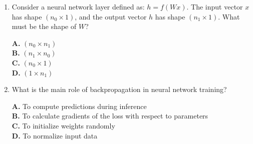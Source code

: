 \documentclass[11pt]{article}
\begin{document}
\begin{enumerate}[label=Q\arabic*., leftmargin=*]
\item Consider a neural network layer defined as: $h = f(Wx)$. The input vector $x$ has shape $(n_0 \times 1)$, and the output vector $h$ has shape $(n_1 \times 1)$. What must be the shape of $W$?

\textbf{A.} $(n_0 \times n_1)$\\
\textbf{B.} $(n_1 \times n_0)$\\
\textbf{C.} $(n_0 \times 1)$\\
\textbf{D.} $(1 \times n_1)$

\item What is the main role of backpropagation in neural network training?

\textbf{A.} To compute predictions during inference\\
\textbf{B.} To calculate gradients of the loss with respect to parameters\\
\textbf{C.} To initialize weights randomly\\
\textbf{D.} To normalize input data

\end{enumerate}
\end{document}
